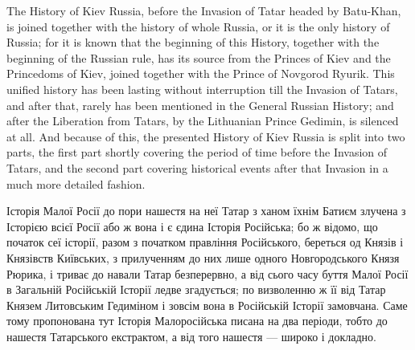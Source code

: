  
 
 
 
 

The History of Kiev Russia, before the Invasion of Tatar headed by Batu-Khan,
is joined together with the history of whole Russia, or it is the only history
of Russia; for it is known that the beginning of this History, together with
the beginning of the Russian rule, has its source from the Princes of Kiev and
the Princedoms of Kiev, joined together with the Prince of Novgorod Ryurik.
This unified history has been lasting without interruption till the Invasion of
Tatars, and after that, rarely has been mentioned in the General Russian
History; and after the Liberation from Tatars, by the Lithuanian Prince
Gedimin, is silenced at all.  And because of this, the presented History of Kiev 
Russia is split into two parts, the first part shortly covering
the period of time before the Invasion of Tatars, and the second part covering historical 
events after that Invasion in a much more detailed fashion.

Історія Малої Росії до пори нашестя на неї Татар з ханом їхнім Батиєм злучена з
Історією всієї Росії або ж вона і є єдина Історія Російська; бо ж відомо, що
початок сеї історії, разом з початком правління Російського, береться од Князів
і Князівств Київських, з прилученням до них лише одного Новгородського Князя
Рюрика, і триває до навали Татар безперервно, а від сього часу буття Малої
Росії в Загальній Російській Історії ледве згадується; по визволенню ж її від
Татар Князем Литовським Гедиміном і зовсім вона в Російській Історії замовчана.
Саме тому пропонована тут Історія Малоросійська писана на два періоди, тобто до
нашестя Татарського екстрактом, а від того нашестя — широко і докладно.
